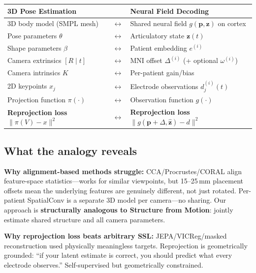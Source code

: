 \documentclass[11pt,letterpaper]{article}
\newcommand{\bfp}{\mathbf{p}}
\newcommand{\bfz}{\mathbf{z}}
\begin{document}
\begin{table}[ht!]\centering\small
\begin{tabular}{@{}p{}c p{}@{}}
\toprule
\textbf{3D Pose Estimation} & & \textbf{Neural Field Decoding} \\
\midrule
3D body model (SMPL mesh) & $\leftrightarrow$ & Shared neural field $g(\bfp, \bfz)$ on cortex \\[3pt]
Pose parameters $\theta$ & $\leftrightarrow$ & Articulatory state $\bfz(t)$ \\[3pt]
Shape parameters $\beta$ & $\leftrightarrow$ & Patient embedding $e^{(i)}$ \\[3pt]
Camera extrinsics $[R \mid t]$ & $\leftrightarrow$ & MNI offset $\Delta^{(i)}$ (+ optional $\omega^{(i)}$) \\[3pt]
Camera intrinsics $K$ & $\leftrightarrow$ & Per-patient gain/bias \\[3pt]
2D keypoints $x_j$ & $\leftrightarrow$ & Electrode observations $d_j^{(i)}(t)$ \\[3pt]
Projection function $\pi(\cdot)$ & $\leftrightarrow$ & Observation function $g(\cdot)$ \\[3pt]
\textbf{Reprojection loss} $\|\pi(V) - x\|^2$ & $\leftrightarrow$ & \textbf{Reprojection loss} $\|g(\bfp{+}\Delta, \hat{\bfz}) - d\|^2$ \\
\bottomrule
\end{tabular}
\end{table}

\subsection{What the analogy reveals}

\textbf{Why alignment-based methods struggle:} CCA/Procrustes/CORAL align feature-space statistics---works for similar viewpoints, but 15--25\,mm placement offsets mean the underlying features are genuinely different, not just rotated. Per-patient SpatialConv is a separate 3D model per camera---no sharing. Our approach is \textbf{structurally analogous to Structure from Motion}: jointly estimate shared structure and all camera parameters.

\textbf{Why reprojection loss beats arbitrary SSL:} JEPA/VICReg/masked reconstruction used physically meaningless targets. Reprojection is geometrically grounded: ``if your latent estimate is correct, you should predict what every electrode observes.'' Self-supervised but geometrically constrained.
\end{document}
